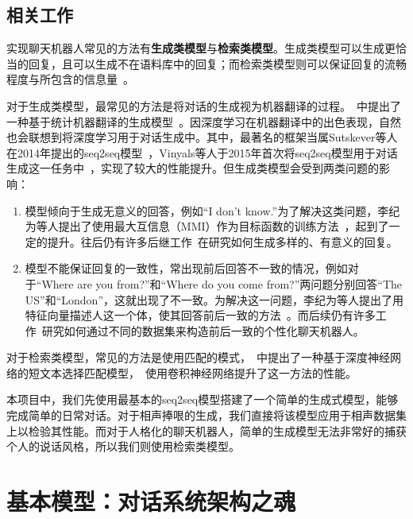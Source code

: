 \documentclass[12pt]{article} %
\begin{document}
\begin{sloppypar}
\subsection{相关工作}

实现聊天机器人常见的方法有{\bf 生成类模型}与{\bf 检索类模型}。生成类模型可以生成更恰当的回复，且可以生成不在语料库中的回复；而检索类模型则可以保证回复的流畅程度与所包含的信息量~\cite{ji2014information}。

对于生成类模型，最常见的方法是将对话的生成视为机器翻译的过程。~\cite{ritter2011data}中提出了一种基于统计机器翻译的生成模型~\cite{zens2002phrase}。因深度学习在机器翻译中的出色表现，自然也会联想到将深度学习用于对话生成中。其中，最著名的框架当属Sutskever等人在2014年提出的seq2seq模型~\cite{sutskever2014sequence}，Vinyals等人于2015年首次将seq2seq模型用于对话生成这一任务中~\cite{vinyals2015neural}，实现了较大的性能提升。但生成类模型会受到两类问题的影响：
\begin{enumerate}
	\item 模型倾向于生成无意义的回答，例如“I don't know.”为了解决这类问题，李纪为等人提出了使用最大互信息（MMI）作为目标函数的训练方法~\cite{li2016diversity}，起到了一定的提升。往后仍有许多后继工作~\cite{shao2017generating}在研究如何生成多样的、有意义的回复。\vspace*{-0.2cm}
	\item 模型不能保证回复的一致性，常出现前后回答不一致的情况，例如对于“Where are you from?”和“Where do you come from?”两问题分别回答“The US”和“London”，这就出现了不一致。为解决这一问题，李纪为等人提出了用特征向量描述人这一个体，使其回答前后一致的方法~\cite{li2016persona}。而后续仍有许多工作~\cite{zhang2018personalizing,su2019personalized}研究如何通过不同的数据集来构造前后一致的个性化聊天机器人。
\end{enumerate}

对于检索类模型，常见的方法是使用匹配的模式，~\cite{lu2013deep}中提出了一种基于深度神经网络的短文本选择匹配模型，~\cite{hu2014convolutional}使用卷积神经网络提升了这一方法的性能。

本项目中，我们先使用最基本的seq2seq模型搭建了一个简单的生成式模型，能够完成简单的日常对话。对于相声捧哏的生成，我们直接将该模型应用于相声数据集上以检验其性能。而对于人格化的聊天机器人，简单的生成模型无法非常好的捕获个人的说话风格，所以我们则使用检索类模型。

\vspace*{-0.4cm}
\section{基本模型：对话系统架构之魂}


\end{sloppypar}
\end{document}

